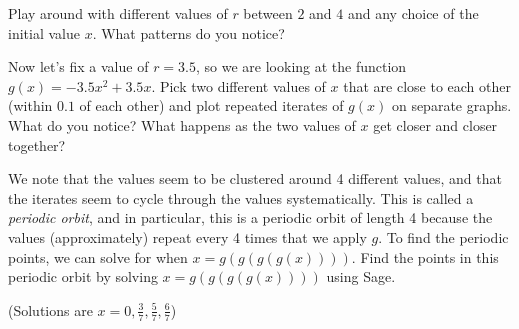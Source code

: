 Play around with different values of $r$ between $2$ and $4$ and any
choice of the initial value $x$. What patterns do you notice?

Now let's fix a value of $r=3.5$, so we are looking at the function
$g(x)=-3.5x^2+3.5x$. Pick two different values of $x$ that are close to each other 
(within $0.1$ of each other) and plot repeated iterates of $g(x)$ on separate
graphs. What do you notice?
What happens as the two values of $x$ get closer and closer together?

We note that the values seem to be clustered around 4 different values,
and that the iterates seem to cycle through the values systematically. This is called
a \textit{periodic orbit}, and in particular, this is a periodic orbit of length 4 because
the values (approximately) repeat every 4 times that we apply $g$. To find
the periodic points, we can solve for when $x=g(g(g(g(x))))$. Find the points
in this periodic orbit by solving $x=g(g(g(g(x))))$ using Sage.

(Solutions are $x=0, \frac{3}{7}, \frac{5}{7}, \frac{6}{7}$)


